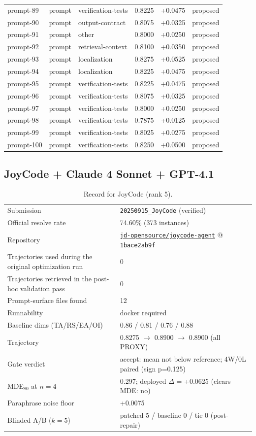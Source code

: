 \begin{center}
\begin{longtable}{llp{5.2cm}rrl}
prompt-89 & prompt & verification-tests & 0.8225 & +0.0475 & proposed \\
prompt-90 & prompt & output-contract & 0.8075 & +0.0325 & proposed \\
prompt-91 & prompt & other & 0.8000 & +0.0250 & proposed \\
prompt-92 & prompt & retrieval-context & 0.8100 & +0.0350 & proposed \\
prompt-93 & prompt & localization & 0.8275 & +0.0525 & proposed \\
prompt-94 & prompt & localization & 0.8225 & +0.0475 & proposed \\
prompt-95 & prompt & verification-tests & 0.8225 & +0.0475 & proposed \\
prompt-96 & prompt & verification-tests & 0.8075 & +0.0325 & proposed \\
prompt-97 & prompt & verification-tests & 0.8000 & +0.0250 & proposed \\
prompt-98 & prompt & verification-tests & 0.7875 & +0.0125 & proposed \\
prompt-99 & prompt & verification-tests & 0.8025 & +0.0275 & proposed \\
prompt-100 & prompt & verification-tests & 0.8250 & +0.0500 & proposed \\
\bottomrule\end{longtable}\end{center}
\clearpage
\subsection{JoyCode + Claude 4 Sonnet + GPT-4.1}
\label{app:agent5}
\begin{table}[h]\centering\scriptsize
\caption{Record for JoyCode (rank 5).}
\begin{tabular}{lp{8.2cm}}\toprule
Submission & \texttt{20250915\_\allowbreak{}JoyCode} (verified) \\
Official resolve rate & 74.60\% (373 instances) \\
Repository & \href{https://github.com/jd-opensource/joycode-agent}{\texttt{jd-opensource/joycode-agent}} @ \texttt{1bace2ab9f} \\
Trajectories used during the original optimization run & 0 \\
Trajectories retrieved in the post-hoc validation pass & 0 \\
Prompt-surface files found & 12 \\
Runnability & docker required \\
Baseline dims (TA/RS/EA/OI) & 0.86 / 0.81 / 0.76 / 0.88 \\
Trajectory & 0.8275 $\to$ 0.8900 $\to$ 0.8900 (all PROXY) \\
Gate verdict & accept: mean not below reference; 4W/0L paired (sign p=0.125) \\
MDE$_{80}$ at $n{=}4$ & 0.297; deployed $\Delta$ = +0.0625 (clears MDE: no) \\
Paraphrase noise floor & +0.0075 \\
Blinded A/B ($k{=}5$) & patched 5 / baseline 0 / tie 0 (post-repair) \\
\bottomrule\end{tabular}\end{table}
